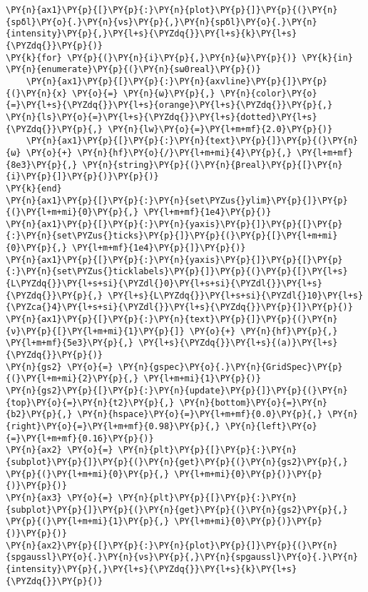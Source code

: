 \begin{Verbatim}[commandchars=\\\{\}]
\PY{n}{ax1}\PY{p}{[}\PY{p}{:}\PY{n}{plot}\PY{p}{]}\PY{p}{(}\PY{n}{spδl}\PY{o}{.}\PY{n}{νs}\PY{p}{,}\PY{n}{spδl}\PY{o}{.}\PY{n}{intensity}\PY{p}{,}\PY{l+s}{\PYZdq{}}\PY{l+s}{k}\PY{l+s}{\PYZdq{}}\PY{p}{)}
\PY{k}{for} \PY{p}{(}\PY{n}{i}\PY{p}{,}\PY{n}{ω}\PY{p}{)} \PY{k}{in} \PY{n}{enumerate}\PY{p}{(}\PY{n}{sω0real}\PY{p}{)}
    \PY{n}{ax1}\PY{p}{[}\PY{p}{:}\PY{n}{axvline}\PY{p}{]}\PY{p}{(}\PY{n}{x} \PY{o}{=} \PY{n}{ω}\PY{p}{,} \PY{n}{color}\PY{o}{=}\PY{l+s}{\PYZdq{}}\PY{l+s}{orange}\PY{l+s}{\PYZdq{}}\PY{p}{,} \PY{n}{ls}\PY{o}{=}\PY{l+s}{\PYZdq{}}\PY{l+s}{dotted}\PY{l+s}{\PYZdq{}}\PY{p}{,} \PY{n}{lw}\PY{o}{=}\PY{l+m+mf}{2.0}\PY{p}{)}
    \PY{n}{ax1}\PY{p}{[}\PY{p}{:}\PY{n}{text}\PY{p}{]}\PY{p}{(}\PY{n}{ω} \PY{o}{+} \PY{n}{hf}\PY{o}{/}\PY{l+m+mi}{4}\PY{p}{,} \PY{l+m+mf}{8e3}\PY{p}{,} \PY{n}{string}\PY{p}{(}\PY{n}{βreal}\PY{p}{[}\PY{n}{i}\PY{p}{]}\PY{p}{)}\PY{p}{)}
\PY{k}{end}
\PY{n}{ax1}\PY{p}{[}\PY{p}{:}\PY{n}{set\PYZus{}ylim}\PY{p}{]}\PY{p}{(}\PY{l+m+mi}{0}\PY{p}{,} \PY{l+m+mf}{1e4}\PY{p}{)}
\PY{n}{ax1}\PY{p}{[}\PY{p}{:}\PY{n}{yaxis}\PY{p}{]}\PY{p}{[}\PY{p}{:}\PY{n}{set\PYZus{}ticks}\PY{p}{]}\PY{p}{(}\PY{p}{[}\PY{l+m+mi}{0}\PY{p}{,} \PY{l+m+mf}{1e4}\PY{p}{]}\PY{p}{)}
\PY{n}{ax1}\PY{p}{[}\PY{p}{:}\PY{n}{yaxis}\PY{p}{]}\PY{p}{[}\PY{p}{:}\PY{n}{set\PYZus{}ticklabels}\PY{p}{]}\PY{p}{(}\PY{p}{[}\PY{l+s}{L\PYZdq{}}\PY{l+s+si}{\PYZdl{}0}\PY{l+s+si}{\PYZdl{}}\PY{l+s}{\PYZdq{}}\PY{p}{,} \PY{l+s}{L\PYZdq{}}\PY{l+s+si}{\PYZdl{}10}\PY{l+s}{\PYZca{}4}\PY{l+s+si}{\PYZdl{}}\PY{l+s}{\PYZdq{}}\PY{p}{]}\PY{p}{)}
\PY{n}{ax1}\PY{p}{[}\PY{p}{:}\PY{n}{text}\PY{p}{]}\PY{p}{(}\PY{n}{ν}\PY{p}{[}\PY{l+m+mi}{1}\PY{p}{]} \PY{o}{+} \PY{n}{hf}\PY{p}{,} \PY{l+m+mf}{5e3}\PY{p}{,} \PY{l+s}{\PYZdq{}}\PY{l+s}{(a)}\PY{l+s}{\PYZdq{}}\PY{p}{)}
\PY{n}{gs2} \PY{o}{=} \PY{n}{gspec}\PY{o}{.}\PY{n}{GridSpec}\PY{p}{(}\PY{l+m+mi}{2}\PY{p}{,} \PY{l+m+mi}{1}\PY{p}{)}
\PY{n}{gs2}\PY{p}{[}\PY{p}{:}\PY{n}{update}\PY{p}{]}\PY{p}{(}\PY{n}{top}\PY{o}{=}\PY{n}{t2}\PY{p}{,} \PY{n}{bottom}\PY{o}{=}\PY{n}{b2}\PY{p}{,} \PY{n}{hspace}\PY{o}{=}\PY{l+m+mf}{0.0}\PY{p}{,} \PY{n}{right}\PY{o}{=}\PY{l+m+mf}{0.98}\PY{p}{,} \PY{n}{left}\PY{o}{=}\PY{l+m+mf}{0.16}\PY{p}{)}
\PY{n}{ax2} \PY{o}{=} \PY{n}{plt}\PY{p}{[}\PY{p}{:}\PY{n}{subplot}\PY{p}{]}\PY{p}{(}\PY{n}{get}\PY{p}{(}\PY{n}{gs2}\PY{p}{,} \PY{p}{(}\PY{l+m+mi}{0}\PY{p}{,} \PY{l+m+mi}{0}\PY{p}{)}\PY{p}{)}\PY{p}{)}
\PY{n}{ax3} \PY{o}{=} \PY{n}{plt}\PY{p}{[}\PY{p}{:}\PY{n}{subplot}\PY{p}{]}\PY{p}{(}\PY{n}{get}\PY{p}{(}\PY{n}{gs2}\PY{p}{,} \PY{p}{(}\PY{l+m+mi}{1}\PY{p}{,} \PY{l+m+mi}{0}\PY{p}{)}\PY{p}{)}\PY{p}{)}
\PY{n}{ax2}\PY{p}{[}\PY{p}{:}\PY{n}{plot}\PY{p}{]}\PY{p}{(}\PY{n}{spgaussl}\PY{o}{.}\PY{n}{νs}\PY{p}{,}\PY{n}{spgaussl}\PY{o}{.}\PY{n}{intensity}\PY{p}{,}\PY{l+s}{\PYZdq{}}\PY{l+s}{k}\PY{l+s}{\PYZdq{}}\PY{p}{)}

\end{Verbatim}
